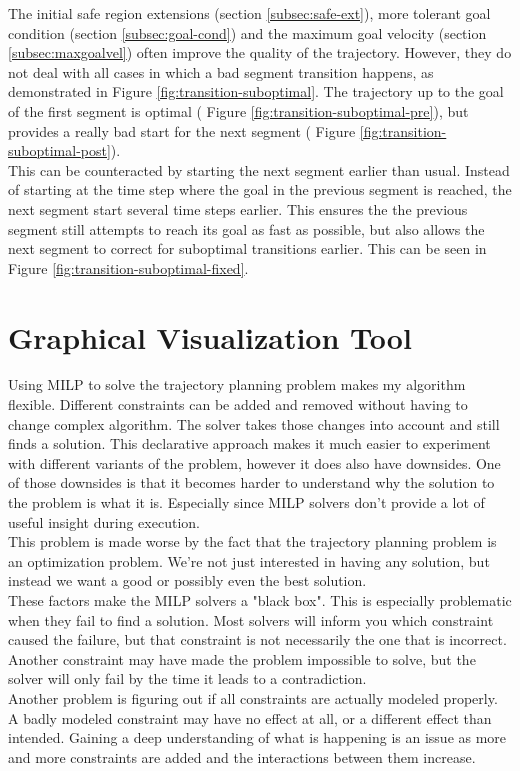 The initial safe region extensions (section \ref{subsec:safe-ext}), more tolerant goal condition (section \ref{subsec:goal-cond}) and the maximum goal velocity (section \ref{subsec:maxgoalvel}) often improve the quality of the trajectory. However, they do not deal with all cases in which a bad segment transition happens, as demonstrated in Figure \ref{fig:transition-suboptimal}. The trajectory up to the goal of the first segment is optimal ( Figure \ref{fig:transition-suboptimal-pre}), but provides a really bad start for the next segment ( Figure \ref{fig:transition-suboptimal-post}). \\
This can be counteracted by starting the next segment earlier than usual. Instead of starting at the time step where the goal in the previous segment is reached, the next segment start several time steps earlier. This ensures the the previous segment still attempts to reach its goal as fast as possible, but also allows the next segment to correct for suboptimal transitions earlier. This can be seen in Figure \ref{fig:transition-suboptimal-fixed}.\\


\section{Graphical Visualization Tool }
\label{section:visual}
Using MILP to solve the trajectory planning problem makes my algorithm flexible. Different constraints can be added and removed without having to change complex algorithm. The solver takes those changes into account and still finds a solution.
This declarative approach makes it much easier to experiment with different variants of the problem, however it does also have downsides. One of those downsides is that it becomes harder to understand why the solution to the problem is what it is. Especially since MILP solvers don't provide a lot of useful insight during execution.\\
This problem is made worse by the fact that the trajectory planning problem is an optimization problem. We're not just interested in having any solution, but instead we want a good or possibly even the best solution.\\
These factors make the MILP solvers a "black box". This is especially problematic when they fail to find a solution. Most solvers will inform you which constraint caused the failure, but that constraint is not necessarily the one that is incorrect. Another constraint may have made the problem impossible to solve, but the solver will only fail by the time it leads to a contradiction.\\
Another problem is figuring out if all constraints are actually modeled properly. A badly modeled constraint may have no effect at all, or a different effect than intended. Gaining a deep understanding of what is happening is an issue as more and more constraints are added and the interactions between them increase.\\

